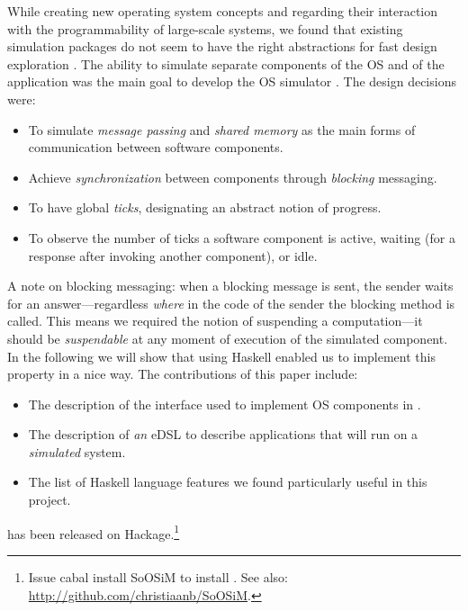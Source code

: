 While creating new operating system concepts and regarding their interaction with the programmability of large-scale systems, we found that existing simulation packages do not seem to have the right abstractions for fast design exploration \cite{cotson,omnet}.
The ability to simulate separate components of the OS and of the application was the main goal to develop the OS simulator \soosim \cite{Baaij:2012}.
The design decisions were:
\begin{itemize}
\item To simulate \emph{message passing} and \emph{shared memory} as the main forms of communication between software components.
\item Achieve \emph{synchronization} between components through \emph{blocking} messaging.
\item To have global \emph{ticks}, designating an abstract notion of progress.
\item To observe the number of ticks a software component is active, waiting (for a response after invoking another component), or idle.
\end{itemize}
A note on blocking messaging: when a blocking message is sent, the sender waits for an answer---regardless \emph{where} in the code of the sender the blocking  method is called.
This means we required the notion of suspending a computation---it should be \emph{suspendable} at any moment of execution of the simulated component.
In the following we will show that using Haskell \cite{haskell-report} enabled us to implement this property in a nice way.
The contributions of this paper include:
\begin{itemize}
\item The description of the interface used to implement OS components in \soosim.
\item The description of \emph{an} eDSL to describe applications that will run on a \soosim \emph{simulated} system.
\item The list of Haskell language features we found particularly
  useful in this project. 
\end{itemize}
\soosim has been released on Hackage.\footnote{Issue \textsf{cabal install SoOSiM} to install \soosim. See also: \url{http://github.com/christiaanb/SoOSiM}.}

